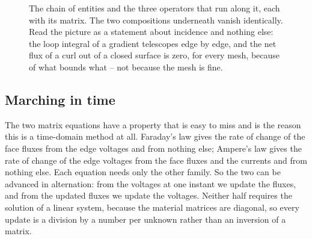 \begin{figure}[htbp]
\centering
{}
\caption{The chain of entities and the three operators that run along it, each with its matrix. The two
compositions underneath vanish identically. Read the picture as a statement about incidence and nothing else:
the loop integral of a gradient telescopes edge by edge, and the net flux of a curl out of a closed surface is
zero, for every mesh, because of what bounds what -- not because the mesh is fine.}
\label{fig:hiw:sequence}
\end{figure}

\subsection{Marching in time}\label{sec:hiw:leapfrog}

The two matrix equations have a property that is easy to miss and is the reason this is a time-domain method at
all. Faraday's law gives the rate of change of the face fluxes from the edge voltages and from nothing else;
Ampere's law gives the rate of change of the edge voltages from the face fluxes and the currents and from nothing
else. Each equation needs only the other family. So the two can be advanced in alternation: from the voltages at
one instant we update the fluxes, and from the updated fluxes we update the voltages. Neither half requires the
solution of a linear system, because the material matrices are diagonal, so every update is a division by a
number per unknown rather than an inversion of a matrix.

